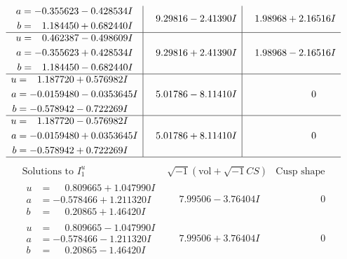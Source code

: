 \documentclass[1p]{elsarticle_modified}
\theoremstyle{definition}
\newcommand{\I}{\sqrt{-1}}
\begin{document}
$$\begin{array}{c|c|c}
\begin{aligned}
a &= -0.355623 - 0.428534 I \\
b &= \phantom{-}1.184450 + 0.682440 I\end{aligned}
 & \phantom{-}9.29816 - 2.41390 I & \phantom{-}1.98968 + 2.16516 I \\ \hline\begin{aligned}
u &= \phantom{-}0.462387 - 0.498609 I \\
a &= -0.355623 + 0.428534 I \\
b &= \phantom{-}1.184450 - 0.682440 I\end{aligned}
 & \phantom{-}9.29816 + 2.41390 I & \phantom{-}1.98968 - 2.16516 I \\ \hline\begin{aligned}
u &= \phantom{-}1.187720 + 0.576982 I \\
a &= -0.0159480 - 0.0353645 I \\
b &= -0.578942 - 0.722269 I\end{aligned}
 & \phantom{-}5.01786 - 8.11410 I & \phantom{-0.000000 } 0 \\ \hline\begin{aligned}
u &= \phantom{-}1.187720 - 0.576982 I \\
a &= -0.0159480 + 0.0353645 I \\
b &= -0.578942 + 0.722269 I\end{aligned}
 & \phantom{-}5.01786 + 8.11410 I & \phantom{-0.000000 } 0\\
 \hline 
 \end{array}$$\newpage$$\begin{array}{c|c|c}  
\text{Solutions to }I^u_{1}& \I (\text{vol} + \sqrt{-1}CS) & \text{Cusp shape}\\
 \hline 
\begin{aligned}
u &= \phantom{-}0.809665 + 1.047990 I \\
a &= -0.578466 + 1.211320 I \\
b &= \phantom{-}0.20865 + 1.46420 I\end{aligned}
 & \phantom{-}7.99506 - 3.76404 I & \phantom{-0.000000 } 0 \\ \hline\begin{aligned}
u &= \phantom{-}0.809665 - 1.047990 I \\
a &= -0.578466 - 1.211320 I \\
b &= \phantom{-}0.20865 - 1.46420 I\end{aligned}
 & \phantom{-}7.99506 + 3.76404 I & \phantom{-0.000000 } 0 \\ \hline\begin{aligned}

\end{aligned}
\end{array}$$
\end{document}
